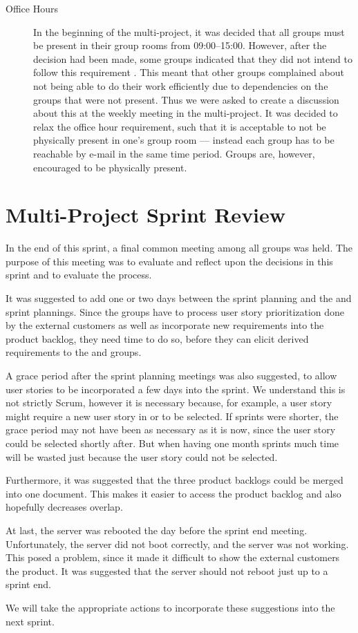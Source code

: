 \begin{description}
  \item[Office Hours] In the beginning of the multi-project, it was decided that all groups must be present in their group rooms from 09:00--15:00. However, after the decision had been made, some groups indicated that they did not intend to follow this requirement . This meant that other groups complained about not being able to do their work efficiently due to dependencies on the groups that were not present. Thus we were asked to create a discussion about this at the weekly meeting in the multi-project. It was decided to relax the office hour requirement, such that it is acceptable to not be physically present in one's group room --- instead each group has to be reachable by e-mail in the same time period. Groups are, however, encouraged to be physically present.
\end{description}

\section{Multi-Project Sprint Review}\label{sec:s1_multiprj_review}
In the end of this sprint, a final common meeting among all groups was held. The purpose of this meeting was to evaluate and reflect upon the decisions in this sprint and to evaluate the process.

It was suggested to add one or two days between the \gui sprint planning and the \db and \bd sprint plannings. Since the \gui groups have to process user story prioritization done by the external customers as well as incorporate new requirements into the product backlog, they need time to do so, before they can elicit derived requirements to the \db and \bd groups.

A grace period after the sprint planning meetings was also suggested, to allow user stories to be incorporated a few days into the sprint. We understand this is not strictly Scrum, however it is necessary because, for example, a \db user story might require a new user story in \gui or \bd to be selected. If sprints were shorter, the grace period may not have been as necessary as it is now, since the user story could be selected shortly after. But when having one month sprints much time will be wasted just because the user story could not be selected.

Furthermore, it was suggested that the three product backlogs could be merged into one document. This makes it easier to access the product backlog and also hopefully decreases overlap.

At last, the server was rebooted the day before the \gui sprint end meeting. Unfortunately, the server did not boot correctly, and the server was not working. This posed a problem, since it made it difficult to show the external customers the product. It was suggested that the server should not reboot just up to a sprint end.

We will take the appropriate actions to incorporate these suggestions into the next sprint.